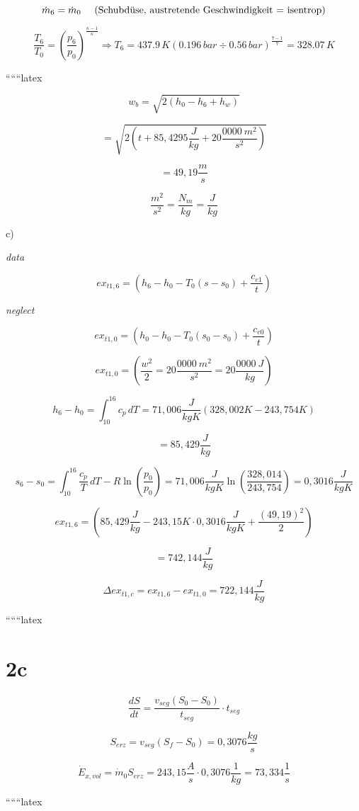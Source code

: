\[
\dot{m}_6 = \dot{m}_0 \text{ \quad (Schubdüse, austretende Geschwindigkeit = isentrop)}
\]

\[
\frac{T_6}{T_0} = \left( \frac{p_6}{p_0} \right)^{\frac{\kappa - 1}{\kappa}} \Rightarrow T_6 = 437.9 \, K \left( 0.196 \, bar \div 0.56 \, bar \right)^{\frac{7-1}{7}} = 328.07 \, K
\]

``````latex


\[
w_{b} = \sqrt{2 \left( h_{0} - h_{6} + h_{w} \right)}
\]

\[
= \sqrt{2 \left( t + 85,4295 \frac{J}{kg} + 20 \frac{0000 \ m^2}{s^2} \right)}
\]

\[
= 49,19 \frac{m}{s}
\]

\[
\frac{m^2}{s^2} = \frac{N_m}{kg} = \frac{J}{kg}
\]

c)

\textit{data}

\[
ex_{t1,6} = \left( h_{6} - h_{0} - T_{0} (s - s_{0}) + \frac{c_{e1}}{t} \right)
\]

\textit{neglect}

\[
ex_{t1,0} = \left( h_{0} - h_{0} - T_{0} (s_{0} - s_{0}) + \frac{c_{e0}}{t} \right)
\]

\[
ex_{t1,0} = \left( \frac{w^2}{2} = 20 \frac{0000 \ m^2}{s^2} = 20 \frac{0000 \ J}{kg} \right)
\]

\[
h_{6} - h_{0} = \int_{10}^{16} c_{p} \, dT = 71,006 \frac{J}{kgK} (328,002 K - 243,754 K)
\]

\[
= 85,429 \frac{J}{kg}
\]

\[
s_{6} - s_{0} = \int_{10}^{16} \frac{c_{p}}{T} \, dT - R \ln \left( \frac{p_{0}}{p_{0}} \right) = 71,006 \frac{J}{kgK} \ln \left( \frac{328,014}{243,754} \right) = 0,3016 \frac{J}{kgK}
\]

\[
ex_{t1,6} = \left( 85,429 \frac{J}{kg} - 243,15 K \cdot 0,3016 \frac{J}{kgK} + \frac{(49,19)^2}{2} \right)
\]

\[
= 742,144 \frac{J}{kg}
\]

\[
\Delta ex_{t1,c} = ex_{t1,6} - ex_{t1,0} = 722,144 \frac{J}{kg}
\]

``````latex


\section*{2c}

\[
\frac{dS}{dt} = \frac{v_{seg}(S_0 - S_0)}{t_{seg}} \cdot t_{seg}
\]

\[
S_{erz} = v_{seg} (S_f - S_0) = 0,3076 \frac{kg}{s}
\]

\[
\dot{E}_{x,vol} = \dot{m}_0 S_{erz} = 243,15 \frac{A}{s} \cdot 0,3076 \frac{1}{kg} = 73,334 \frac{1}{s}
\]

``````latex


